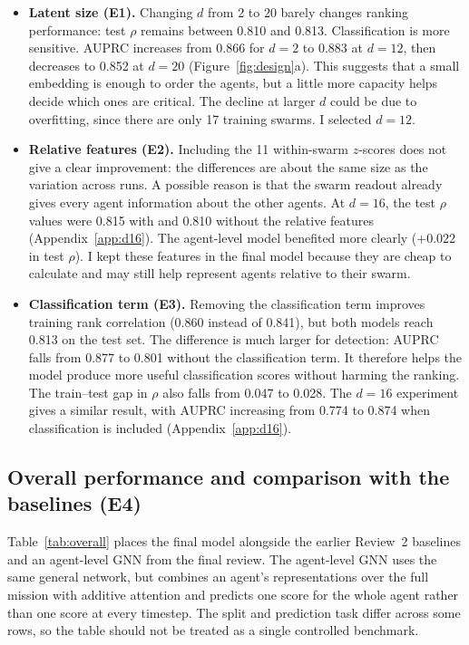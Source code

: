 \documentclass[11pt,a4paper]{article}
\begin{document}
\begin{itemize}
\item \textbf{Latent size (E1).} Changing $d$ from 2 to 20 barely changes ranking performance: test $\rho$ remains
between 0.810 and 0.813. Classification is more sensitive. AUPRC increases from 0.866 for $d=2$ to 0.883 at
$d=12$, then decreases to 0.852 at $d=20$ (Figure~\ref{fig:design}a). This suggests that a small embedding is
enough to order the agents, but a little more capacity helps decide which ones are critical. The decline at larger
$d$ could be due to overfitting, since there are only 17 training swarms. I selected $d=12$.
\item \textbf{Relative features (E2).} Including the 11 within-swarm $z$-scores does not give a clear improvement:
the differences are about the same size as the variation across runs. A possible reason is that the swarm readout
already gives every agent information about the other agents. At $d=16$, the test $\rho$ values were 0.815 with
and 0.810 without the relative features (Appendix~\ref{app:d16}). The agent-level model benefited more clearly
($+0.022$ in test $\rho$). I kept these features in the final model because they are cheap to calculate and may
still help represent agents relative to their swarm.
\item \textbf{Classification term (E3).} Removing the classification term improves training rank correlation
(0.860 instead of 0.841), but both models reach 0.813 on the test set. The difference is much larger for detection:
AUPRC falls from 0.877 to 0.801 without the classification term. It therefore helps the model produce more useful
classification scores without harming the ranking. The train--test gap in $\rho$ also falls from 0.047 to 0.028.
The $d=16$ experiment gives a similar result, with AUPRC increasing from 0.774 to 0.874 when classification is included
(Appendix~\ref{app:d16}).

\end{itemize}

\FloatBarrier
\subsection{Overall performance and comparison with the baselines (E4)}\label{sec:overall}
Table~\ref{tab:overall} places the final model alongside the earlier Review~2 baselines and an agent-level GNN
from the final review. The agent-level GNN uses the same general network, but combines an agent's representations
over the full mission with additive attention and predicts one score for the whole agent rather than one score
at every timestep. The split and prediction task differ across some rows, so the table should not be treated
as a single controlled benchmark.
\end{document}
